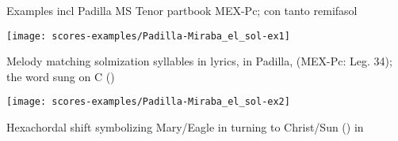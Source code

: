 	Examples \X incl Padilla MS Tenor partbook MEX-Pc; con tanto remifasol


\begin{example}
\texttt{[image: scores-examples/Padilla-Miraba\_el\_sol-ex1]}
\caption{Melody matching solmization syllables in lyrics, in Padilla,  (MEX-Pc: Leg. 34); the word  sung on C ()}
\label{ex:Padilla-Miraba_el_sol-ex1}
\end{example}

\begin{example}
\texttt{[image: scores-examples/Padilla-Miraba\_el\_sol-ex2]}
\caption{Hexachordal shift symbolizing Mary/Eagle in  turning to Christ/Sun () in }
\label{ex:Padilla-Miraba_el_sol-ex2}
\end{example}
%
